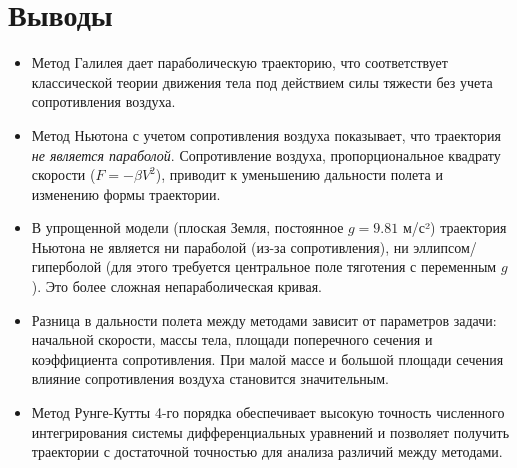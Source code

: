 \documentclass[a4paper, 14pt]{extarticle}
\begin{document}
\section{Выводы}
\begin{itemize}
  \item Метод Галилея дает параболическую траекторию, что соответствует классической теории движения тела под действием силы тяжести без учета сопротивления воздуха.
  
  \item Метод Ньютона с учетом сопротивления воздуха показывает, что траектория \emph{не является параболой}. Сопротивление воздуха, пропорциональное квадрату скорости ($F = -\beta V^2$), приводит к уменьшению дальности полета и изменению формы траектории.
  
  \item В упрощенной модели (плоская Земля, постоянное $g = 9.81$ м/с²) траектория Ньютона не является ни параболой (из-за сопротивления), ни эллипсом/гиперболой (для этого требуется центральное поле тяготения с переменным $g$). Это более сложная непараболическая кривая.
  
  \item Разница в дальности полета между методами зависит от параметров задачи: начальной скорости, массы тела, площади поперечного сечения и коэффициента сопротивления. При малой массе и большой площади сечения влияние сопротивления воздуха становится значительным.
  
  \item Метод Рунге-Кутты 4-го порядка обеспечивает высокую точность численного интегрирования системы дифференциальных уравнений и позволяет получить траектории с достаточной точностью для анализа различий между методами.
\end{itemize}
\end{document}
